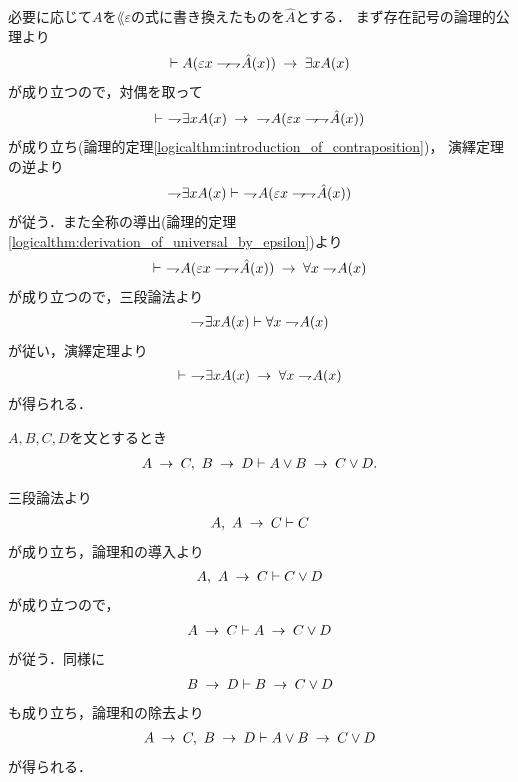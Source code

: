 	\begin{sketch}
		必要に応じて$A$を$\lang{\varepsilon}$の式に書き換えたものを$\hat{A}$とする．
		まず存在記号の論理的公理より
		\begin{align}
			\vdash A(\varepsilon x \negation \negation \hat{A}(x))
			\rarrow \exists x A(x)
		\end{align}
		が成り立つので，対偶を取って
		\begin{align}
			\vdash\ \negation \exists x A(x) 
			\rarrow\ \negation A(\varepsilon x \negation \negation \hat{A}(x))
		\end{align}
		が成り立ち(論理的定理\ref{logicalthm:introduction_of_contraposition})，
		演繹定理の逆より
		\begin{align}
			\negation \exists x A(x) \vdash\ \negation A(\varepsilon x \negation \negation \hat{A}(x))
		\end{align}
		が従う．また全称の導出(論理的定理\ref{logicalthm:derivation_of_universal_by_epsilon})より
		\begin{align}
			\vdash\ \negation A(\varepsilon x \negation \negation \hat{A}(x))
			\rarrow \forall x \negation A(x)
		\end{align}
		が成り立つので，三段論法より
		\begin{align}
			\negation \exists x A(x) \vdash \forall x \negation A(x)
		\end{align}
		が従い，演繹定理より
		\begin{align}
			\vdash\ \negation \exists x A(x) \rarrow \forall x \negation A(x)
		\end{align}
		が得られる．
		\QED
	\end{sketch}
	
	\begin{screen}
		\begin{logicalthm}[含意の論理和への遺伝性2]
		\label{logicalthm:heredity_of_implication_to_disjunction_2}
			$A,B,C,D$を文とするとき
			\begin{align}
				A \rarrow C,\ B \rarrow D \vdash A \vee B \rarrow C \vee D.
			\end{align}
		\end{logicalthm}
	\end{screen}
	
	\begin{sketch}
		三段論法より
		\begin{align}
			A,\ A \rarrow C \vdash C
		\end{align}
		が成り立ち，論理和の導入より
		\begin{align}
			A,\ A \rarrow C \vdash C \vee D
		\end{align}
		が成り立つので，
		\begin{align}
			A \rarrow C \vdash A \rarrow C \vee D
		\end{align}
		が従う．同様に
		\begin{align}
			B \rarrow D \vdash B \rarrow C \vee D
		\end{align}
		も成り立ち，論理和の除去より
		\begin{align}
			A \rarrow C,\ B \rarrow D \vdash A \vee B \rarrow C \vee D
		\end{align}
		が得られる．
		\QED
	\end{sketch}
	
